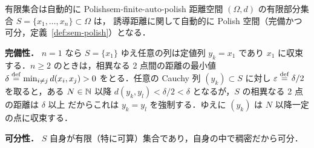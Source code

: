 \begin{remark}{有限集合は自動的に Polish}{sem-finite-auto-polish}
  距離空間 $(\Omega, d)$ の有限部分集合 $S = \{x_1, \ldots, x_n\} \subset \Omega$ は，
  誘導距離に関して自動的に Polish 空間（完備かつ可分，定義~\ref{def:sem-polish}）となる．

  \textbf{完備性．} $n = 1$ なら $S = \{x_1\}$ ゆえ任意の列は定値列 $y_k = x_1$ であり
  $x_1$ に収束する．$n \geq 2$ のときは，相異なる 2 点間の距離の最小値
  $\delta \overset{\mathrm{def}}{=} \min_{i \neq j} d(x_i, x_j) > 0$ をとる．任意の Cauchy 列
  $(y_k) \subset S$ に対し $\varepsilon \overset{\mathrm{def}}{=} \delta/2$ を取ると，ある $N \in \mathbb{N}$ 以降
  $d(y_k, y_l) < \delta/2 < \delta$ となるが，$S$ の相異なる 2 点の距離は $\delta$ 以上
  だからこれは $y_k = y_l$ を強制する．ゆえに $(y_k)$ は $N$ 以降一定の点に収束する．

  \textbf{可分性．} $S$ 自身が有限（特に可算）集合であり，自身の中で稠密だから可分．
\end{remark}
